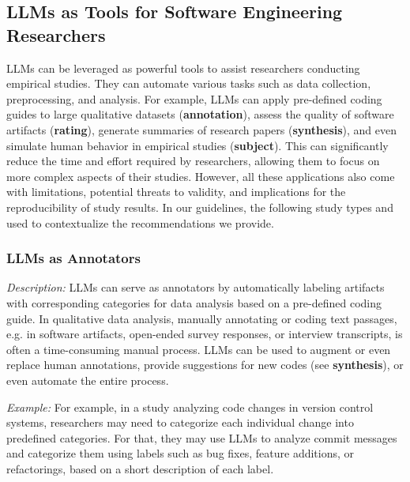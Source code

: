 \documentclass[11pt]{article}
\begin{document}
\subsection{LLMs as Tools for Software Engineering Researchers}

LLMs can be leveraged as powerful tools to assist researchers conducting empirical studies.
They can automate various tasks such as data collection, preprocessing, and analysis.
For example, LLMs can apply pre-defined coding guides to large qualitative datasets (\textbf{annotation}), assess the quality of software artifacts (\textbf{rating}), generate summaries of research papers (\textbf{synthesis}), and even simulate human behavior in empirical studies (\textbf{subject}).
This can significantly reduce the time and effort required by researchers, allowing them to focus on more complex aspects of their studies.
However, all these applications also come with limitations, potential threats to validity, and implications for the reproducibility of study results.
In our guidelines, the following study types and used to contextualize the recommendations we provide.


\subsubsection{LLMs as Annotators}

\emph{Description:} LLMs can serve as annotators by automatically labeling artifacts with corresponding categories for data analysis based on a pre-defined coding guide.
In qualitative data analysis, manually annotating or coding text passages, e.g. in software artifacts, open-ended survey responses, or interview transcripts, is often a time-consuming manual process.
LLMs can be used to augment or even replace human annotations, provide suggestions for new codes (see \textbf{synthesis}), or even automate the entire process.

\emph{Example:} For example, in a study analyzing code changes in version control systems, researchers may need to categorize each individual change into predefined categories.
For that, they may use LLMs to analyze commit messages and categorize them using labels such as bug fixes, feature additions, or refactorings, based on a short description of each label.
\end{document}
